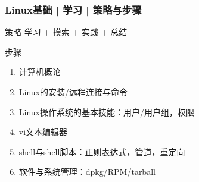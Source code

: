 \begin{frame}
  \frametitle{Linux基础 | 学习 | 策略与步骤}
  \begin{block}{策略}
    学习 + 摸索 + 实践 + 总结
  \end{block}
  \pause
  \begin{block}{步骤}
    \begin{enumerate}[<+->]
      \item 计算机概论
      \item Linux的安装/远程连接与命令
      \item Linux操作系统的基本技能：用户/用户组，权限
      \item vi文本编辑器
      \item shell与shell脚本：正则表达式，管道，重定向
      \item 软件与系统管理：dpkg/RPM/tarball
    \end{enumerate}
  \end{block}
\end{frame}

